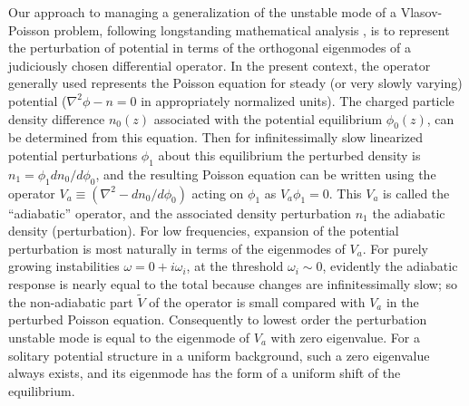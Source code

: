 \documentclass{jpp}
\begin{document}
Our approach to managing a generalization of the unstable mode of a
Vlasov-Poisson problem, following longstanding mathematical
analysis
\citep{Lewis1979,Symon1982}, is to represent the perturbation of
potential in terms of the orthogonal eigenmodes of a judiciously
chosen differential operator. In the present context, the operator
generally used
\citep{Lewis1982} represents the Poisson equation for
steady (or very slowly varying) potential ($\nabla^2\phi-n=0$ in
appropriately normalized units). The charged particle density
difference $n_0(z)$ associated with the potential equilibrium
$\phi_0(z)$, can be determined from this equation. Then for
infinitessimally slow linearized potential perturbations $\phi_1$
about this equilibrium the perturbed density is
$n_1=\phi_1dn_0/d\phi_0$, and the resulting Poisson equation can be
written using the operator $V_a \equiv(\nabla^2-dn_0/d\phi_0)$ acting
on $\phi_1$ as $V_a\phi_1=0$. This $V_a$ is called the ``adiabatic''
operator, and the associated density perturbation $n_1$ the adiabatic
density (perturbation). For low frequencies, expansion of the
potential perturbation is most naturally in terms of the eigenmodes of
$V_a$. For purely growing instabilities $\omega=0+i\omega_i$, at the
threshold $\omega_i\sim 0$, evidently the adiabatic response is nearly
equal to the total because changes are infinitessimally slow; so the
non-adiabatic part $\tilde V$ of the operator is small compared with
$V_a$ in the perturbed Poisson equation. Consequently to lowest order
the perturbation unstable mode is equal to the eigenmode of $V_a$ with
zero eigenvalue. For a solitary potential structure in a uniform
background, such a zero eigenvalue always exists, and its eigenmode
has the form of a uniform shift of the equilibrium.
\end{document}
